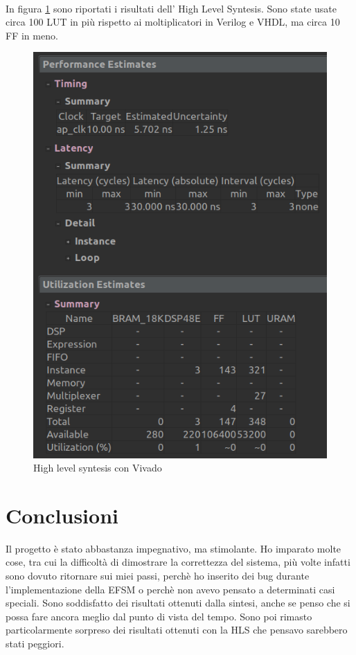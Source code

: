 \documentclass[]{IEEEtran}
\begin{document}
\\In figura \ref{fig:HLS} sono riportati i risultati dell' High Level Syntesis. Sono state usate circa 100 LUT in più rispetto ai moltiplicatori in Verilog e VHDL, ma circa 10 FF in meno. 
\begin{figure}[!htb]
    \centering
    \includegraphics[width=0.5\linewidth]{figures/hls}
    \caption{High level syntesis con Vivado}
    \label{fig:HLS}
\end{figure}



\section{Conclusioni}
Il progetto è stato abbastanza impegnativo, ma stimolante. Ho imparato molte cose, tra cui la difficoltà di dimostrare la correttezza del sistema, più volte infatti sono dovuto ritornare sui miei passi, perchè ho inserito dei bug durante l'implementazione della EFSM o perchè non avevo pensato a determinati casi speciali. Sono soddisfatto dei risultati ottenuti dalla sintesi, anche se penso che si possa fare ancora meglio dal punto di vista del tempo. Sono poi rimasto particolarmente sorpreso dei risultati ottenuti con la HLS che pensavo sarebbero stati peggiori.



\nocite{*}


\appendix
\end{document}
